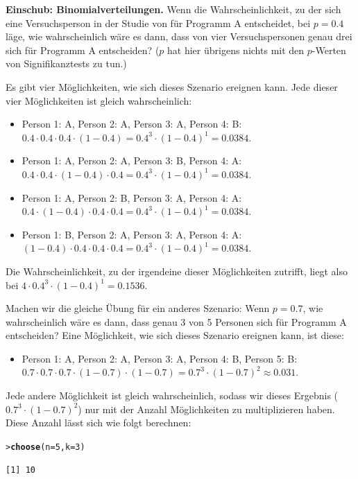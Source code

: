 \documentclass[oneside, 10pt]{book}\usepackage[]{graphicx}\usepackage[]{xcolor}
\makeatletter
\newcommand{\hlnum}[1]{\textcolor[rgb]{0.686,0.059,0.569}{#1}}%
\newcommand{\hlstd}[1]{\textcolor[rgb]{0.345,0.345,0.345}{#1}}%
\newcommand{\hlkwc}[1]{\textcolor[rgb]{0.333,0.667,0.333}{#1}}%
\newcommand{\hlkwd}[1]{\textcolor[rgb]{0.737,0.353,0.396}{\textbf{#1}}}%
\newenvironment{kframe}{%
 \def\at@end@of@kframe{}%
 \ifinner\ifhmode%
  \def\at@end@of@kframe{\end{minipage}}%
  \begin{minipage}{\columnwidth}%
 \fi\fi%
 \def\FrameCommand##1{\hskip\@totalleftmargin \hskip-\fboxsep
 \colorbox{shadecolor}{##1}\hskip-\fboxsep
     \hskip-\linewidth \hskip-\@totalleftmargin \hskip\columnwidth}%
 \MakeFramed {\advance\hsize-\width
   \@totalleftmargin\z@ \linewidth\hsize
   \@setminipage}}%
 {\par\unskip\endMakeFramed%
 \at@end@of@kframe}
\newenvironment{knitrout}{}{} %
\makeatother
\begin{document}
\begin{framed}
\textbf{Einschub: Binomialverteilungen.}
Wenn die Wahrscheinlichkeit, zu der sich eine
Versuchsperson in der Studie von \citet{Tversky1981}
für Programm A entscheidet, bei $p = 0.4$ läge,
wie wahrscheinlich wäre es dann, dass von vier
Versuchspersonen genau drei sich für Programm A entscheiden?
($p$ hat hier übrigens nichts mit den $p$-Werten von
Signifikanztests zu tun.)

Es gibt vier Möglichkeiten, wie sich dieses Szenario
ereignen kann. Jede dieser vier Möglichkeiten ist gleich
wahrscheinlich:
\begin{itemize}
  \item Person 1: A, Person 2: A, Person 3: A, Person 4: B: $0.4 \cdot 0.4 \cdot 0.4 \cdot (1-0.4) = 0.4^3 \cdot (1-0.4)^1 = 0.0384.$
  \item Person 1: A, Person 2: A, Person 3: B, Person 4: A: $0.4 \cdot 0.4 \cdot (1-0.4) \cdot 0.4 = 0.4^3 \cdot (1-0.4)^1 = 0.0384.$
  \item Person 1: A, Person 2: B, Person 3: A, Person 4: A: $0.4 \cdot (1-0.4) \cdot 0.4 \cdot 0.4 = 0.4^3 \cdot (1-0.4)^1 = 0.0384.$
  \item Person 1: B, Person 2: A, Person 3: A, Person 4: A: $(1-0.4) \cdot 0.4 \cdot 0.4 \cdot 0.4 = 0.4^3 \cdot (1-0.4)^1 = 0.0384.$
\end{itemize}
Die Wahrscheinlichkeit, zu der irgendeine dieser Möglichkeiten
zutrifft, liegt also bei $4 \cdot 0.4^3 \cdot (1-0.4)^1 = 0.1536$.

Machen wir die gleiche Übung für ein anderes Szenario:
Wenn $p = 0.7$, wie wahrscheinlich wäre es dann, dass genau 3 von
5 Personen sich für Programm A entscheiden?
Eine Möglichkeit, wie sich dieses Szenario ereignen kann, ist diese:
\begin{itemize}
  \item Person 1: A, Person 2: A, Person 3: A, Person 4: B, Person 5: B: $0.7 \cdot 0.7 \cdot 0.7 \cdot (1-0.7) \cdot (1-0.7) = 0.7^3 \cdot (1-0.7)^2 \approx 0.031.$
\end{itemize}
Jede andere Möglichkeit ist gleich wahrscheinlich, sodass wir
dieses Ergebnis ($0.7^3 \cdot (1-0.7)^2$) nur mit der Anzahl
Möglichkeiten zu multiplizieren haben. Diese Anzahl lässt sich
wie folgt berechnen:
\begin{knitrout}
\color{fgcolor}\begin{kframe}
\begin{alltt}
\hlstd{> }\hlkwd{choose}\hlstd{(}\hlkwc{n} \hlstd{=} \hlnum{5}\hlstd{,} \hlkwc{k} \hlstd{=} \hlnum{3}\hlstd{)}
\end{alltt}
\begin{verbatim}
[1] 10
\end{verbatim}
\end{kframe}
\end{knitrout}


\end{framed}
\end{document}
